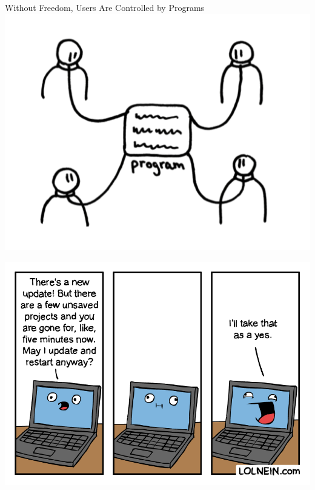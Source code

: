 \documentclass[pdf]{beamer}
\begin{document}
\begin{frame}{Without Freedom, Users Are Controlled by Programs}
  \includegraphics[width=\textwidth]{prog-ctrl-users.png}
\end{frame}

\begin{frame}
  \includegraphics[width=\textwidth]{updateandrestart.png}
\end{frame}
\end{document}
